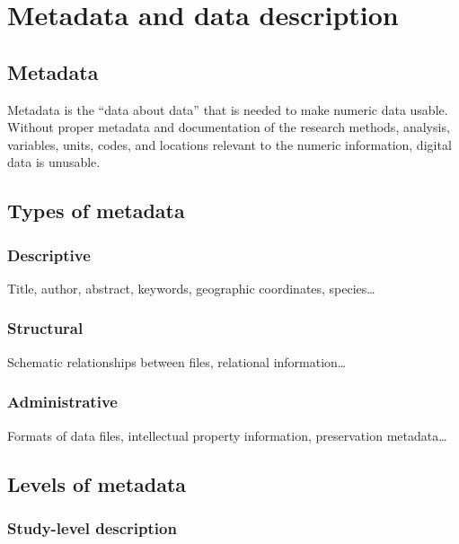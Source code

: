 \section{Metadata and data
description}\label{metadata-and-data-description}

\subsection{Metadata}\label{metadata}

Metadata is the ``data about data'' that is needed to make numeric data
usable. Without proper metadata and documentation of the research
methods, analysis, variables, units, codes, and locations relevant to
the numeric information, digital data is unusable.

\subsection{Types of metadata}\label{types-of-metadata}

\subsubsection{Descriptive}\label{descriptive}

Title, author, abstract, keywords, geographic coordinates,
species\ldots{}

\subsubsection{Structural}\label{structural}

Schematic relationships between files, relational information\ldots{}

\subsubsection{Administrative}\label{administrative}

Formats of data files, intellectual property information, preservation
metadata\ldots{}

\subsection{Levels of metadata}\label{levels-of-metadata}

\subsubsection{Study-level description}\label{study-level-description}

